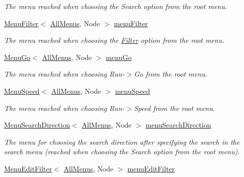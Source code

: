 \begin{DoxyCompactItemize}
\begin{DoxyCompactList}\small\item\em The menu reached when choosing the Search option from the root menu. \end{DoxyCompactList}\item 
\hyperlink{structMenuFilter}{Menu\+Filter}$<$ \hyperlink{structAllMenus}{All\+Menus}, Node $>$ \hyperlink{structAllMenus_a57e9685de43bbc68fb8ae47806aede25}{menu\+Filter}\hypertarget{structAllMenus_a57e9685de43bbc68fb8ae47806aede25}{}\label{structAllMenus_a57e9685de43bbc68fb8ae47806aede25}

\begin{DoxyCompactList}\small\item\em The menu reached when choosing the \hyperlink{structFilter}{Filter} option from the root menu. \end{DoxyCompactList}\item 
\hyperlink{structMenuGo}{Menu\+Go}$<$ \hyperlink{structAllMenus}{All\+Menus}, Node $>$ \hyperlink{structAllMenus_a96f78f945e18445b528c2f13e15153d7}{menu\+Go}\hypertarget{structAllMenus_a96f78f945e18445b528c2f13e15153d7}{}\label{structAllMenus_a96f78f945e18445b528c2f13e15153d7}

\begin{DoxyCompactList}\small\item\em The menu reached when choosing Run-\/$>$Go from the root menu. \end{DoxyCompactList}\item 
\hyperlink{structMenuSpeed}{Menu\+Speed}$<$ \hyperlink{structAllMenus}{All\+Menus}, Node $>$ \hyperlink{structAllMenus_a235fc465612bfb1a04c7ad347c24bfac}{menu\+Speed}\hypertarget{structAllMenus_a235fc465612bfb1a04c7ad347c24bfac}{}\label{structAllMenus_a235fc465612bfb1a04c7ad347c24bfac}

\begin{DoxyCompactList}\small\item\em The menu reached when choosing Run-\/$>$Speed from the root menu. \end{DoxyCompactList}\item 
\hyperlink{structMenuSearchDirection}{Menu\+Search\+Direction}$<$ \hyperlink{structAllMenus}{All\+Menus}, Node $>$ \hyperlink{structAllMenus_a658f1b612d7ac62aa05ea2fb42cdd668}{menu\+Search\+Direction}\hypertarget{structAllMenus_a658f1b612d7ac62aa05ea2fb42cdd668}{}\label{structAllMenus_a658f1b612d7ac62aa05ea2fb42cdd668}

\begin{DoxyCompactList}\small\item\em The menu for choosing the search direction after specifying the search in the search menu (reached when choosing the Search option from the root menu). \end{DoxyCompactList}\item 
\hyperlink{structMenuEditFilter}{Menu\+Edit\+Filter}$<$ \hyperlink{structAllMenus}{All\+Menus}, Node $>$ \hyperlink{structAllMenus_aa7c437e79545aff2b480f71521badb97}{menu\+Edit\+Filter}\hypertarget{structAllMenus_aa7c437e79545aff2b480f71521badb97}{}\label{structAllMenus_aa7c437e79545aff2b480f71521badb97}


\end{DoxyCompactItemize}
